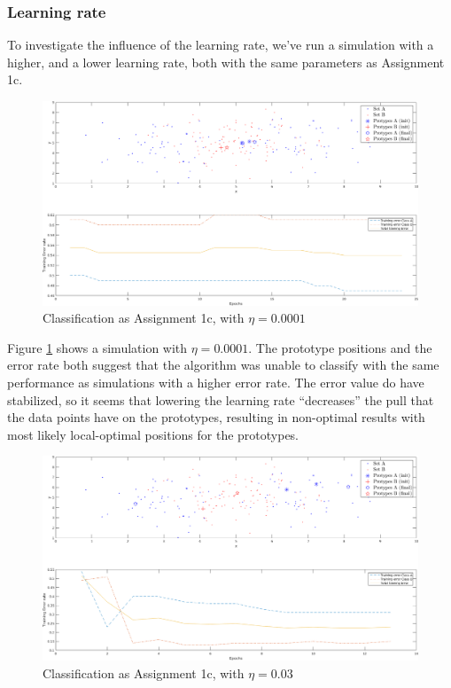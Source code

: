 \documentclass[10pt]{article}
\begin{document}
\subsubsection{Learning rate}
To investigate the influence of the learning rate, we've run a simulation with a higher, and a lower learning rate, 
both with the same parameters as Assignment 1c.
\begin{figure}[H]
 \centering
 \includegraphics[width=\textwidth]{Fig12_c_0001.png}
 \caption{Classification as Assignment 1c, with $\eta=0.0001$}
 \label{fig1.12c_0001}
\end{figure}
Figure \ref{fig1.12c_0001} shows a simulation with $\eta=0.0001$. The prototype positions and the error rate 
both suggest that the algorithm was unable to classify with the same performance as simulations with a higher error rate.
The error value do have stabilized, so it seems that lowering the learning rate ``decreases'' the pull that the data points have 
on the prototypes, resulting in non-optimal results with most likely local-optimal positions for the prototypes.

\begin{figure}[H]
 \centering
 \includegraphics[width=\textwidth]{Fig12_c_03.png}
 \caption{Classification as Assignment 1c, with $\eta=0.03$}
 \label{fig1.12c_03}
\end{figure}
\end{document}
